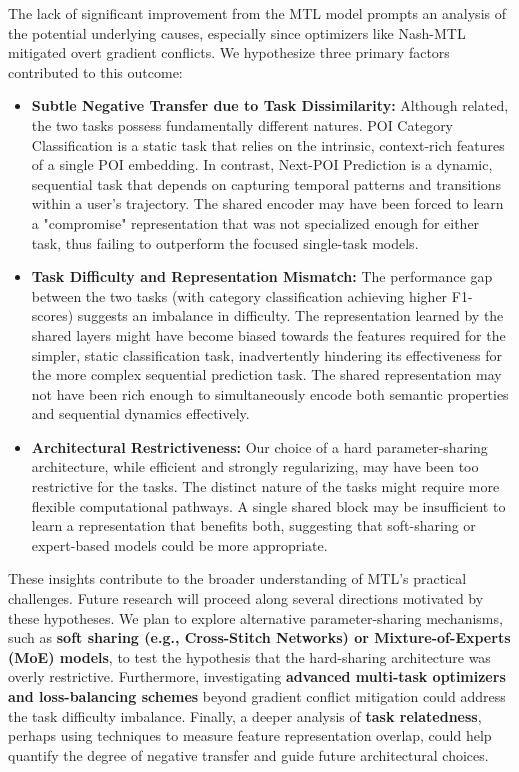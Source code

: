 The lack of significant improvement from the MTL model prompts an analysis of the potential underlying causes, especially since optimizers like Nash-MTL mitigated overt gradient conflicts. We hypothesize three primary factors contributed to this outcome:
\begin{itemize}
    \item \textbf{Subtle Negative Transfer due to Task Dissimilarity:} Although related, the two tasks possess fundamentally different natures. POI Category Classification is a static task that relies on the intrinsic, context-rich features of a single POI embedding. In contrast, Next-POI Prediction is a dynamic, sequential task that depends on capturing temporal patterns and transitions within a user's trajectory. The shared encoder may have been forced to learn a "compromise" representation that was not specialized enough for either task, thus failing to outperform the focused single-task models.
    \item \textbf{Task Difficulty and Representation Mismatch:} The performance gap between the two tasks (with category classification achieving higher F1-scores) suggests an imbalance in difficulty. The representation learned by the shared layers might have become biased towards the features required for the simpler, static classification task, inadvertently hindering its effectiveness for the more complex sequential prediction task. The shared representation may not have been rich enough to simultaneously encode both semantic properties and sequential dynamics effectively.
    \item \textbf{Architectural Restrictiveness:} Our choice of a hard parameter-sharing architecture, while efficient and strongly regularizing, may have been too restrictive for the tasks. The distinct nature of the tasks might require more flexible computational pathways. A single shared block may be insufficient to learn a representation that benefits both, suggesting that soft-sharing or expert-based models could be more appropriate.
\end{itemize}

These insights contribute to the broader understanding of MTL's practical challenges. Future research will proceed along several directions motivated by these hypotheses. We plan to explore alternative parameter-sharing mechanisms, such as \textbf{soft sharing (e.g., Cross-Stitch Networks) or Mixture-of-Experts (MoE) models}, to test the hypothesis that the hard-sharing architecture was overly restrictive. Furthermore, investigating \textbf{advanced multi-task optimizers and loss-balancing schemes} beyond gradient conflict mitigation could address the task difficulty imbalance. Finally, a deeper analysis of \textbf{task relatedness}, perhaps using techniques to measure feature representation overlap, could help quantify the degree of negative transfer and guide future architectural choices.